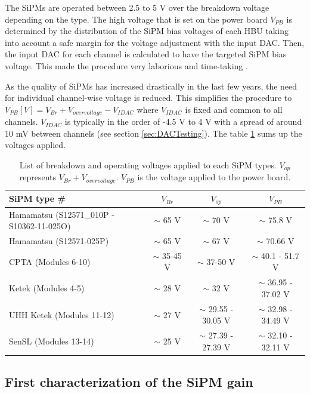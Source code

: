 The SiPMs are operated between 2.5 to 5 V over the breakdown voltage depending on the type. The high voltage that is set on the power board $V_{PB}$ is determined by the distribution of the SiPM bias voltages of each HBU taking into account a safe margin for the voltage adjustment with the input DAC. Then, the input DAC for each channel is calculated to have the targeted SiPM bias voltage. This made the procedure very laborious and time-taking \cite{Hartbrich2012}.

As the quality of SiPMs has increased drastically in the last few years, the need for individual channel-wise voltage is reduced. This simplifies the procedure to $V_{PB} [V] = V_{Br} + V_{overvoltage} - V_{IDAC}$ where $V_{IDAC}$ is fixed and common to all channels. $V_{IDAC}$ is typically in the order of -4.5 V to 4 V with a spread of around 10 mV between channels (see section \ref{sec:DACTesting}). The table \ref{table:Voltage_SiPM} sums up the voltages applied.

\begin{table}[htb!]
  \centering
  \caption{List of breakdown and operating voltages applied to each SiPM types. $V_{op}$ represents $V_{Br} + V_{overvoltage}$. $V_{PB}$ is the voltage applied to the power board.}
  \label{table:Voltage_SiPM}
  \begin{tabular}{@{}lccc@{}}
    \toprule
    SiPM type \# & $V_{Br}$ & $V_{op}$ & $V_{PB}$\\
    \midrule
    Hamamatsu (S12571\_010P - S10362-11-025O) & $\sim$ 65 V & $\sim$ 70 V & $\sim$ 75.8 V\\
    Hamamatsu (S12571-025P) & $\sim$ 65 V & $\sim$ 67 V & $\sim$ 70.66 V\\
    CPTA (Modules 6-10) & $\sim$ 35-45 V & $\sim$ 37-50 V & $\sim$ 40.1 - 51.7 V\\
    Ketek (Modules 4-5) & $\sim$ 28 V & $\sim$ 32 V & $\sim$ 36.95 - 37.02 V\\
    UHH Ketek (Modules 11-12) & $\sim$ 27 V & $\sim$ 29.55 - 30.05 V & $\sim$ 32.98 - 34.49 V\\
    SenSL (Modules 13-14) & $\sim$ 25 V & $\sim$ 27.39 - 27.39 V & $\sim$ 32.10 - 32.11 V\\
    \bottomrule
  \end{tabular}
\end{table}

\subsection{First characterization of the SiPM gain}
\label{subsec:GainCharac}

